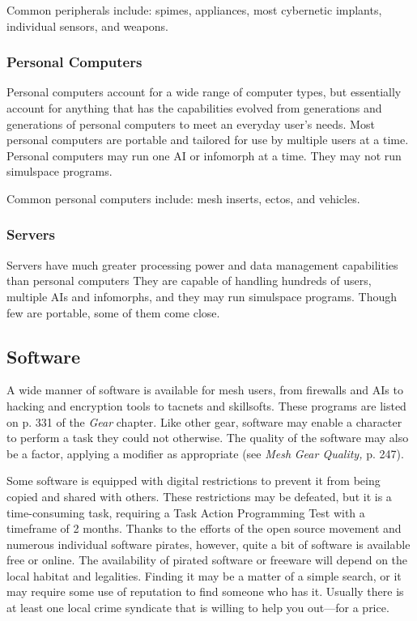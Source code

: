 Common peripherals include: spimes, appliances, most 
cybernetic implants, individual sensors, and weapons.

\subsubsection{Personal Computers}

Personal computers account for a wide range of computer
types, but essentially account for anything that
has the capabilities evolved from generations and generations
of personal computers to meet an everyday
user's needs. Most personal computers are portable 
and tailored for use by multiple users at a time. Personal
computers may run one AI or infomorph at a
time. They may not run simulspace programs.

Common personal computers include: mesh inserts, 
ectos, and vehicles.

\subsubsection{Servers}

Servers have much greater processing power and 
data management capabilities than personal computers
They are capable of handling hundreds of users,
multiple AIs and infomorphs, and they may run 
simulspace programs. Though few are portable, some 
of them come close.

\subsection{Software}

A wide manner of software is available for mesh users, 
from firewalls and AIs to hacking and encryption tools 
to tacnets and skillsofts. These programs are listed on 
p. 331 of the \textit{Gear }chapter. Like other gear, software 
may enable a character to perform a task they could 
not otherwise. The quality of the software may also be 
a factor, applying a modifier as appropriate (see \textit{Mesh }
\textit{Gear Quality,} p. 247).

Some software is equipped with digital restrictions 
to prevent it from being copied and shared with others. 
These restrictions may be defeated, but it is a time-consuming
task, requiring a Task Action Programming Test
with a timeframe of 2 months. Thanks to the efforts 
of the open source movement and numerous individual 
software pirates, however, quite a bit of software is 
available free or online. The availability of pirated software
or freeware will depend on the local habitat and
legalities. Finding it may be a matter of a simple search, 
or it may require some use of reputation to find someone
who has it. Usually there is at least one local crime
syndicate that is willing to help you out—for a price.

